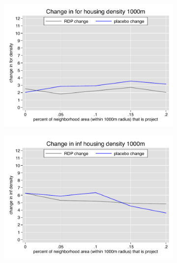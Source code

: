 \documentclass[12pt]{article}
\begin{document}
\begin{figure}
\begin{subfigure}[b]{0.495\textwidth}
        \end{subfigure}
        \vspace{-6mm}
        \begin{subfigure}[b]{0.495\textwidth}
            \centering
            \includegraphics[width=\textwidth,trim={0.3cm .3cm 0.1cm 0cm}, clip=true]{figures/change_for_1000_total.pdf}
        \end{subfigure}
        \hfill
        \begin{subfigure}[b]{0.495\textwidth}  
            \centering 
            \includegraphics[width=\textwidth,trim={0.3cm .3cm 0.1cm 0cm}, clip=true]{figures/change_inf_1000_total.pdf}
        \end{subfigure}
        \vspace{-6mm}
    \end{figure} 
\end{document}
